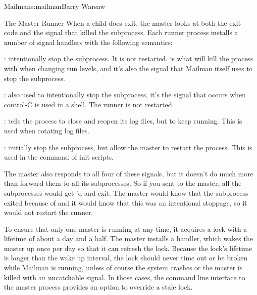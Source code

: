 \begin{aosachapter}{Mailman}{s:mailman}{Barry Warsaw}
\begin{aosasect1}{The Master Runner}
When a child does exit, the master looks at both the exit code and the
signal that killed the subprocess.  Each runner process installs a
number of signal handlers with the following semantics:

\begin{aosaitemize}

\item{}: intentionally stop the subprocess.  It is not
  restarted.   is what  will kill the process
  with when changing run levels, and it's also the signal that Mailman
  itself uses to stop the subprocess.

\item{}: also used to intentionally stop the subprocess,
  it's the signal that occurs when control-C is used in a shell.  The
  runner is not restarted.

\item{}: tells the process to close and reopen its log
  files, but to keep running.  This is used when rotating log files.

\item{}: initially stop the subprocess, but allow the
  master to restart the process.  This is used in the 
  command of init scripts.

\end{aosaitemize}

The master also responds to all four of these signals, but it doesn't
do much more than forward them to all its subprocesses.  So if you
sent  to the master, all the subprocesses would get
'd and exit.  The master would know that the subprocess
exited because of  and it would know that this was an
intentional stoppage, so it would not restart the runner.

To ensure that only one master is running at any time, it acquires a
lock with a lifetime of about a day and a half.  The master installs a
 handler, which wakes the master up once per day so that
it can refresh the lock.  Because the lock's lifetime is longer than
the wake up interval, the lock should never time out or be broken
while Mailman is running, unless of course the system crashes or the
master is killed with an uncatchable signal.  In those cases, the
command line interface to the master process provides an option to
override a stale lock.


\end{aosasect1}
\end{aosachapter}
